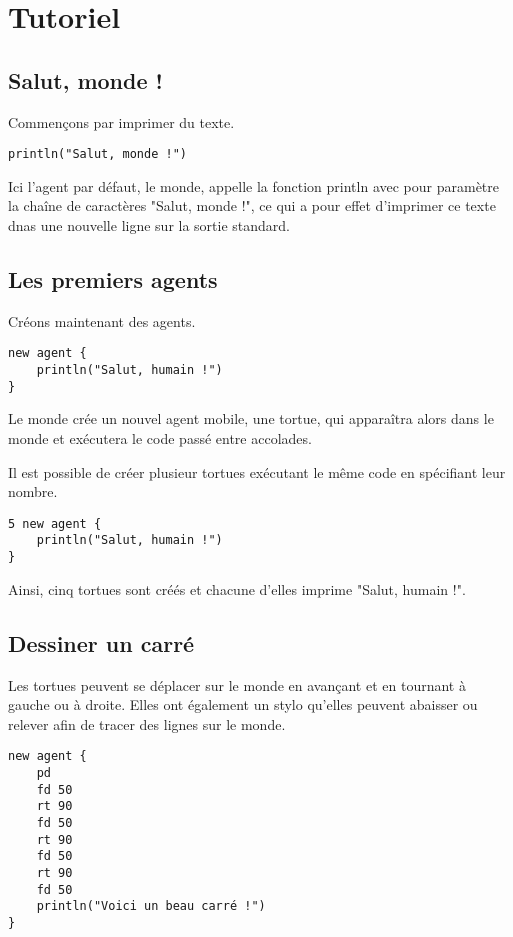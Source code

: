 \section{Tutoriel}

\subsection{Salut, monde !}

Commençons par imprimer du texte.

\begin{verbatim}
println("Salut, monde !")
\end{verbatim}

Ici l'agent par défaut, le monde, appelle la fonction println avec pour paramètre la chaîne de caractères "Salut, monde !", ce qui a pour effet d'imprimer ce texte dnas une nouvelle ligne sur la sortie standard.

\subsection{Les premiers agents}

Créons maintenant des agents.

\begin{verbatim}
new agent {
    println("Salut, humain !")
}
\end{verbatim}

Le monde crée un nouvel agent mobile, une tortue, qui apparaîtra alors dans le monde et exécutera le code passé entre accolades.

Il est possible de créer plusieur tortues exécutant le même code en spécifiant leur nombre.

\begin{verbatim}
5 new agent {
    println("Salut, humain !")
}
\end{verbatim}

Ainsi, cinq tortues sont créés et chacune d'elles imprime "Salut, humain !".

\subsection{Dessiner un carré}

Les tortues peuvent se déplacer sur le monde en avançant et en tournant à gauche ou à droite. Elles ont également un stylo qu'elles peuvent abaisser ou relever afin de tracer des lignes sur le monde.

\begin{verbatim}
new agent {
    pd
    fd 50
    rt 90
    fd 50
    rt 90
    fd 50
    rt 90
    fd 50
    println("Voici un beau carré !")
}
\end{verbatim}


